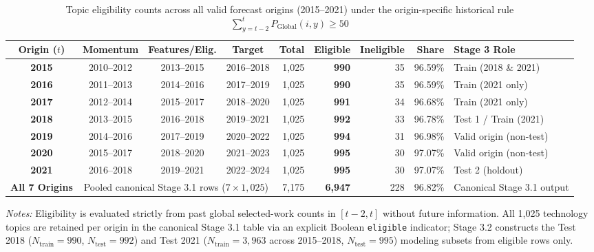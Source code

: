 \begin{table}[htbp]
\centering
\caption{Topic eligibility counts across all valid forecast origins (2015--2021) under the origin-specific historical rule $\sum_{y=t-2}^{t} P_{\text{Global}}(i, y) \ge 50$}
\label{tab:origin-eligibility}
\footnotesize
\setlength{\tabcolsep}{3.5pt}
\begin{tabular}{c c c c r r r r l}
\toprule
\textbf{Origin ($t$)} & \textbf{Momentum} & \textbf{Features/Elig.} & \textbf{Target} & \textbf{Total} & \textbf{Eligible} & \textbf{Ineligible} & \textbf{Share} & \textbf{Stage 3 Role} \\
\midrule
\textbf{2015} & 2010--2012 & 2013--2015 & 2016--2018 & 1,025 & \textbf{990} & 35 & 96.59\% & Train (2018 \& 2021) \\
\textbf{2016} & 2011--2013 & 2014--2016 & 2017--2019 & 1,025 & \textbf{990} & 35 & 96.59\% & Train (2021 only) \\
\textbf{2017} & 2012--2014 & 2015--2017 & 2018--2020 & 1,025 & \textbf{991} & 34 & 96.68\% & Train (2021 only) \\
\textbf{2018} & 2013--2015 & 2016--2018 & 2019--2021 & 1,025 & \textbf{992} & 33 & 96.78\% & Test 1 / Train (2021) \\
\textbf{2019} & 2014--2016 & 2017--2019 & 2020--2022 & 1,025 & \textbf{994} & 31 & 96.98\% & Valid origin (non-test) \\
\textbf{2020} & 2015--2017 & 2018--2020 & 2021--2023 & 1,025 & \textbf{995} & 30 & 97.07\% & Valid origin (non-test) \\
\textbf{2021} & 2016--2018 & 2019--2021 & 2022--2024 & 1,025 & \textbf{995} & 30 & 97.07\% & Test 2 (holdout) \\
\midrule
\textbf{All 7 Origins} & \multicolumn{3}{c}{Pooled canonical Stage 3.1 rows ($7 \times 1{,}025$)} & 7,175 & \textbf{6,947} & 228 & 96.82\% & Canonical Stage 3.1 output \\
\bottomrule
\end{tabular}

\vspace{4pt}
\parbox{14.8cm}{\scriptsize \textit{Notes:} Eligibility is evaluated strictly from past global selected-work counts in $[t-2, t]$ without future information. All 1,025 technology topics are retained per origin in the canonical Stage 3.1 table via an explicit Boolean \texttt{eligible} indicator; Stage 3.2 constructs the Test 2018 ($N_{\text{train}}=990$, $N_{\text{test}}=992$) and Test 2021 ($N_{\text{train}}=3{,}963$ across 2015--2018, $N_{\text{test}}=995$) modeling subsets from eligible rows only.}
\end{table}

